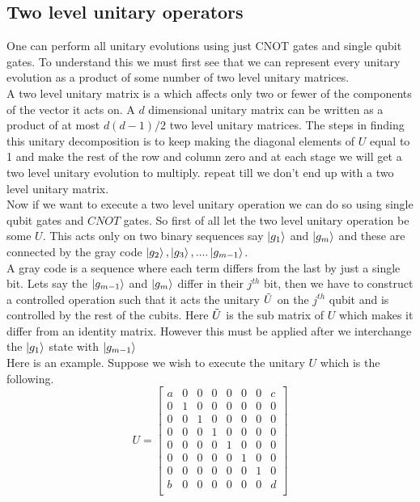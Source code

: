 \documentclass{report}
\begin{document}
\subsection{Two level unitary operators}
One can perform all unitary evolutions using just CNOT gates and single qubit gates. To understand this we must first see that we can represent every unitary evolution as a product of some number of two level unitary matrices.\\
A two level unitary matrix is a which affects only two or fewer of the components of the vector it acts on. A $d$ dimensional unitary matrix can be written as a product of at most $d(d-1)/2$ two level unitary matrices. The steps in finding this unitary decomposition is to keep making the diagonal elements of $U$ equal to 1 and make the rest of the row and column zero and at each stage we will get a two level unitary evolution to multiply. repeat till we don't end up with a two level unitary matrix.\\
Now if we want to execute a two level unitary operation we can do so using single qubit gates and $CNOT$ gates. So first of all let the two level unitary operation be some $U$. This acts only on two binary sequences say $\ket{g_1}$ and $\ket{g_m}$ and these are connected by the gray code $\ket{g_2}, \ket{g_3},....\ket{g_{m-1}}$. \\
A gray code is a sequence where each term differs from the last by just a single bit. Lets say the $\ket{g_{m-1}}$ and $\ket{g_m}$ differ in their $j^{th}$ bit, then we have to construct a controlled operation such that it acts the unitary $\Tilde{U}$ on the $j^{th}$ qubit and is controlled by the rest of the cubits. Here $\Tilde{U}$ is the sub matrix of $U$ which makes it differ from an identity matrix. However this must be applied after we interchange the $\ket{g_1}$ state with $\ket{g_{m-1}}$\\
Here is an example. Suppose we wish to execute the unitary $U$ which is the following.
$$U = \begin{bmatrix}
      a & 0 & 0 & 0 & 0 & 0 & 0 & c\\
      0 & 1 & 0 & 0 & 0 & 0 & 0 & 0\\
      0 & 0 & 1 & 0 & 0 & 0 & 0 & 0\\
      0 & 0 & 0 & 1 & 0 & 0 & 0 & 0\\
      0 & 0 & 0 & 0 & 1 & 0 & 0 & 0\\
      0 & 0 & 0 & 0 & 0 & 1 & 0 & 0\\
      0 & 0 & 0 & 0 & 0 & 0 & 1 & 0\\
      b & 0 & 0 & 0 & 0 & 0 & 0 & d\\
      \end{bmatrix}$$
\end{document}

